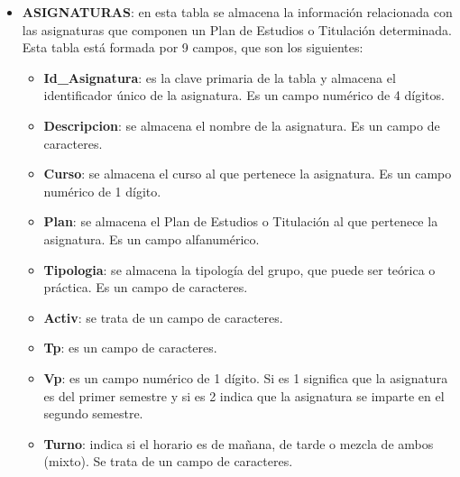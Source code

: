 \begin{itemize}
\item
\textbf{ASIGNATURAS}: en esta tabla se almacena la información relacionada con las asignaturas que componen un Plan de Estudios o Titulación determinada. Esta tabla está formada por 9 campos, que son los siguientes:
\begin{itemize}
\item
\textbf{Id\_Asignatura}: es la clave primaria de la tabla y almacena el identificador único de la asignatura. Es un campo numérico de 4 dígitos.
\item
\textbf{Descripcion}: se almacena el nombre de la asignatura. Es un campo de caracteres.
\item
\textbf{Curso}: se almacena el curso al que pertenece la asignatura. Es un campo numérico de 1 dígito.
\item
\textbf{Plan}: se almacena el Plan de Estudios o Titulación al que pertenece la asignatura. Es un campo alfanumérico.
\item
\textbf{Tipologia}: se almacena la tipología del grupo, que puede ser teórica o práctica. Es un campo de caracteres.
\item
\textbf{Activ}: se trata de un campo de caracteres.
\item
\textbf{Tp}: es un campo de caracteres.
\item
\textbf{Vp}: es un campo numérico de 1 dígito. Si es 1 significa que la asignatura es del primer semestre y si es 2 indica que la asignatura se imparte en el segundo semestre.
\item
\textbf{Turno}: indica si el horario es de mañana, de tarde o mezcla de ambos (mixto). Se trata de un campo de caracteres.
\end{itemize}







\end{itemize}
